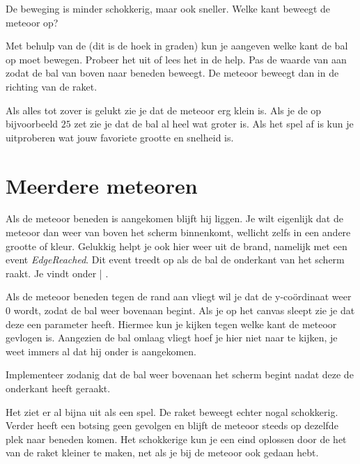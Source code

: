De beweging is minder schokkerig, maar ook sneller. Welke kant beweegt de meteoor op? 

\begin{opgave}
   \opgVraag
	Met behulp van de  (dit is de hoek in graden) kun je aangeven welke kant de bal op moet bewegen. Probeer het uit of lees het in de help. Pas de waarde van  aan zodat de bal van boven naar beneden beweegt. De meteoor beweegt dan in de richting van de raket. 
\end{opgave}

Als alles tot zover is gelukt zie je dat de meteoor erg klein is. Als je de  op bijvoorbeeld $25$ zet zie je dat de bal al heel wat groter is. Als het spel af is kun je uitproberen wat jouw favoriete grootte en snelheid is.

\section{Meerdere meteoren}
Als de meteoor beneden is aangekomen blijft hij liggen. Je wilt eigenlijk dat de meteoor dan weer van boven het scherm binnenkomt,  wellicht zelfs in een andere grootte of kleur. Gelukkig helpt \ai je ook hier weer uit de brand, namelijk met een event \emph{EdgeReached}. Dit event treedt op als de bal de onderkant van het scherm raakt. Je vindt  onder  | . 

Als de meteoor beneden tegen de rand aan vliegt wil je dat de y-co\"ordinaat weer $0$ wordt, zodat de bal weer bovenaan begint. Als je  op het canvas sleept zie je dat deze een parameter  heeft. Hiermee kun je kijken tegen welke kant de meteoor gevlogen is. Aangezien de bal omlaag vliegt hoef je hier niet naar te kijken, je weet immers al dat hij onder is aangekomen. 

\begin{opgave}
	\opgVraag
	Implementeer  zodanig dat de bal weer bovenaan het scherm begint nadat deze de onderkant heeft geraakt. 
\end{opgave}


Het ziet er al bijna uit als een spel. De raket beweegt echter nogal schokkerig. Verder heeft een botsing geen gevolgen en blijft de meteoor steeds op dezelfde plek naar beneden komen. Het schokkerige kun je een eind oplossen door de het  van de raket kleiner te maken, net als je bij de meteoor ook gedaan hebt. 

